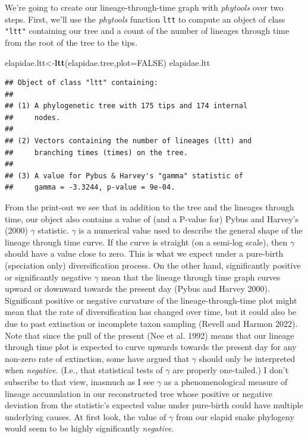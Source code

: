 \documentclass[fleqn,10pt,lineno]{wlpeerj} %
\newenvironment{Shaded}{\begin{snugshade}}{\end{snugshade}}
\newcommand{\AttributeTok}[1]{\textcolor[rgb]{0.13,0.29,0.53}{#1}}
\newcommand{\ConstantTok}[1]{\textcolor[rgb]{0.56,0.35,0.01}{#1}}
\newcommand{\FunctionTok}[1]{\textcolor[rgb]{0.13,0.29,0.53}{\textbf{#1}}}
\newcommand{\NormalTok}[1]{#1}
\newcommand{\OtherTok}[1]{\textcolor[rgb]{0.56,0.35,0.01}{#1}}
\begin{document}
We're going to create our lineage-through-time graph with \emph{phytools} over two steps. First, we'll use the \emph{phytools} function \texttt{ltt} to compute an object of class \texttt{"ltt"} containing our tree and a count of the number of lineages through time from the root of the tree to the tips.

\begin{Shaded}
\begin{Highlighting}[]
\NormalTok{elapidae.ltt}\OtherTok{\textless{}{-}}\FunctionTok{ltt}\NormalTok{(elapidae.tree,}\AttributeTok{plot=}\ConstantTok{FALSE}\NormalTok{)}
\NormalTok{elapidae.ltt}
\end{Highlighting}
\end{Shaded}

\begin{verbatim}
## Object of class "ltt" containing:
## 
## (1) A phylogenetic tree with 175 tips and 174 internal
##     nodes.
## 
## (2) Vectors containing the number of lineages (ltt) and
##     branching times (times) on the tree.
## 
## (3) A value for Pybus & Harvey's "gamma" statistic of
##     gamma = -3.3244, p-value = 9e-04.
\end{verbatim}

From the print-out we see that in addition to the tree and the lineages through time, our object also contains a value of (and a P-value for) Pybus and Harvey's (2000) \(\gamma\) statistic. \(\gamma\) is a numerical value used to describe the general shape of the lineage through time curve. If the curve is straight (on a semi-log scale), then \(\gamma\) should have a value close to zero. This is what we expect under a pure-birth (speciation only) diversification process. On the other hand, significantly positive or significantly negative \(\gamma\) mean that the lineage through time graph curves upward or downward towards the present day (Pybus and Harvey 2000). Significant positive or negative curvature of the lineage-through-time plot might mean that the rate of diversification has changed over time, but it could also be due to past extinction or incomplete taxon sampling (Revell and Harmon 2022). Note that since the pull of the present (Nee et al. 1992) means that our lineage through time plot is expected to curve upwards towards the present day for any non-zero rate of extinction, some have argued that \(\gamma\) should only be interpreted when \emph{negative}. (I.e., that statistical tests of \(\gamma\) are properly one-tailed.) I don't subscribe to that view, inasmuch as I see \(\gamma\) as a phenomenological measure of lineage accumulation in our reconstructed tree whose positive or negative deviation from the statistic's expected value under pure-birth could have multiple underlying causes. At first look, the value of \(\gamma\) from our elapid snake phylogeny would seem to be highly significantly \emph{negative}.
\end{document}

